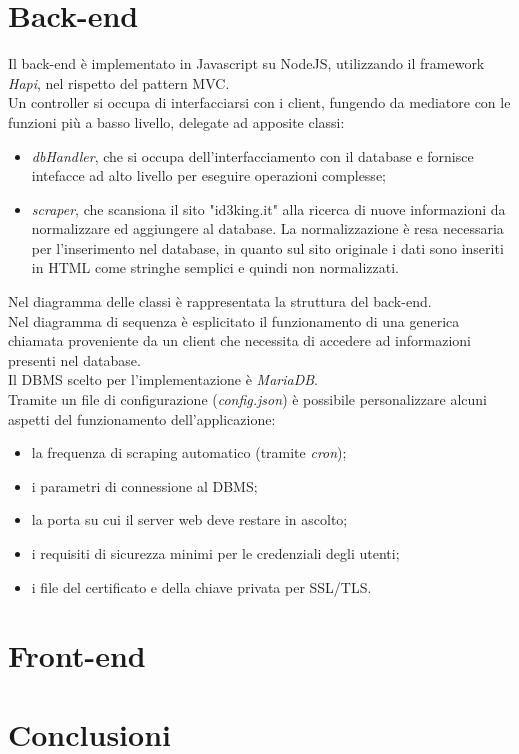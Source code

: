 \documentclass[11pt]{report}
\begin{document}
\section{Back-end}
Il back-end è implementato in Javascript su NodeJS, utilizzando il framework \textit{Hapi}, nel rispetto del pattern MVC.
\\Un controller si occupa di interfacciarsi con i client, fungendo da mediatore con le funzioni più a basso livello, delegate ad apposite classi:
\begin{itemize}
	\item \textit{dbHandler}, che si occupa dell'interfacciamento con il database e fornisce intefacce ad alto livello per eseguire operazioni complesse;
	\item \textit{scraper}, che scansiona il sito "id3king.it" alla ricerca di nuove informazioni da normalizzare ed aggiungere al database.
	La normalizzazione è resa necessaria per l'inserimento nel database, in quanto sul sito originale i dati sono inseriti in HTML come stringhe semplici e quindi non normalizzati.
\end{itemize}
Nel diagramma delle classi è rappresentata la struttura del back-end.
\\Nel diagramma di sequenza è esplicitato il funzionamento di una generica chiamata proveniente da un client che necessita di accedere ad informazioni presenti nel database.
\\Il DBMS scelto per l'implementazione è \textit{MariaDB}.
\\Tramite un file di configurazione (\textit{config.json}) è possibile personalizzare alcuni aspetti del funzionamento dell'applicazione:
\begin{itemize}
	\item la frequenza di scraping automatico (tramite \textit{cron});
	\item i parametri di connessione al DBMS;
	\item la porta su cui il server web deve restare in ascolto;
	\item i requisiti di sicurezza minimi per le credenziali degli utenti;
	\item i file del certificato e della chiave privata per SSL/TLS.
\end{itemize}

\section{Front-end}

\section{Conclusioni}
\end{document}
